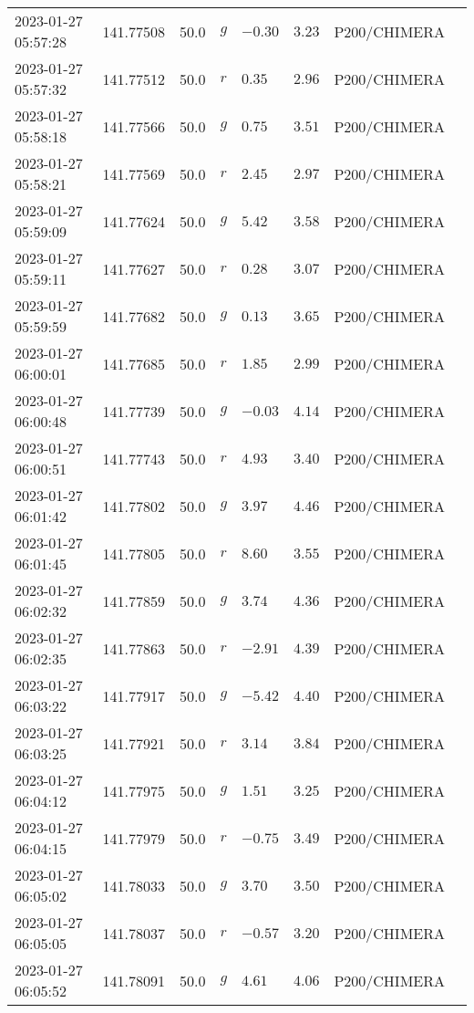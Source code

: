 \documentclass{nature_plusfigure}
\begin{document}
\begin{supplement}
\begin{center}
\begin{longtable}{llllllll}
2023-01-27 05:57:28 & 141.77508 & 50.0 & $g$ & $-0.30$ & $3.23$ & P200/CHIMERA &  \\ 
2023-01-27 05:57:32 & 141.77512 & 50.0 & $r$ & $0.35$ & $2.96$ & P200/CHIMERA &  \\ 
2023-01-27 05:58:18 & 141.77566 & 50.0 & $g$ & $0.75$ & $3.51$ & P200/CHIMERA &  \\ 
2023-01-27 05:58:21 & 141.77569 & 50.0 & $r$ & $2.45$ & $2.97$ & P200/CHIMERA &  \\ 
2023-01-27 05:59:09 & 141.77624 & 50.0 & $g$ & $5.42$ & $3.58$ & P200/CHIMERA &  \\ 
2023-01-27 05:59:11 & 141.77627 & 50.0 & $r$ & $0.28$ & $3.07$ & P200/CHIMERA &  \\ 
2023-01-27 05:59:59 & 141.77682 & 50.0 & $g$ & $0.13$ & $3.65$ & P200/CHIMERA &  \\ 
2023-01-27 06:00:01 & 141.77685 & 50.0 & $r$ & $1.85$ & $2.99$ & P200/CHIMERA &  \\ 
2023-01-27 06:00:48 & 141.77739 & 50.0 & $g$ & $-0.03$ & $4.14$ & P200/CHIMERA &  \\ 
2023-01-27 06:00:51 & 141.77743 & 50.0 & $r$ & $4.93$ & $3.40$ & P200/CHIMERA &  \\ 
2023-01-27 06:01:42 & 141.77802 & 50.0 & $g$ & $3.97$ & $4.46$ & P200/CHIMERA &  \\ 
2023-01-27 06:01:45 & 141.77805 & 50.0 & $r$ & $8.60$ & $3.55$ & P200/CHIMERA &  \\ 
2023-01-27 06:02:32 & 141.77859 & 50.0 & $g$ & $3.74$ & $4.36$ & P200/CHIMERA &  \\ 
2023-01-27 06:02:35 & 141.77863 & 50.0 & $r$ & $-2.91$ & $4.39$ & P200/CHIMERA &  \\ 
2023-01-27 06:03:22 & 141.77917 & 50.0 & $g$ & $-5.42$ & $4.40$ & P200/CHIMERA &  \\ 
2023-01-27 06:03:25 & 141.77921 & 50.0 & $r$ & $3.14$ & $3.84$ & P200/CHIMERA &  \\ 
2023-01-27 06:04:12 & 141.77975 & 50.0 & $g$ & $1.51$ & $3.25$ & P200/CHIMERA &  \\ 
2023-01-27 06:04:15 & 141.77979 & 50.0 & $r$ & $-0.75$ & $3.49$ & P200/CHIMERA &  \\ 
2023-01-27 06:05:02 & 141.78033 & 50.0 & $g$ & $3.70$ & $3.50$ & P200/CHIMERA &  \\ 
2023-01-27 06:05:05 & 141.78037 & 50.0 & $r$ & $-0.57$ & $3.20$ & P200/CHIMERA &  \\ 
2023-01-27 06:05:52 & 141.78091 & 50.0 & $g$ & $4.61$ & $4.06$ & P200/CHIMERA &  \\ 

\end{longtable}
\end{center}
\end{supplement}
\end{document}
